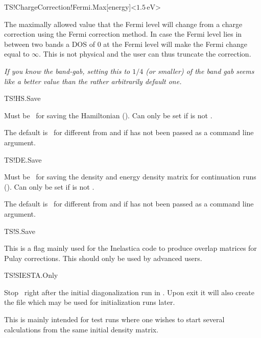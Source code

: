 \begin{fdfentry}{TS!ChargeCorrection!Fermi.Max}[energy]<$1.5\,\mathrm{eV}$>%

  The maximally allowed value that the Fermi level will change from a
  charge correction using the Fermi correction method. In case the
  Fermi level lies in between two bands a DOS of $0$ at the Fermi
  level will make the Fermi change equal to $\infty$. This is not
  physical and the user can thus truncate the correction.
  
  \emph{If you know the band-gab, setting this to $1/4$ (or smaller)
      of the band gab seems like a better value than the rather
      arbitrarily default one.}

\end{fdfentry}

\begin{fdflogicalT}{TS!HS.Save}

  Must be \fdftrue\ for saving the Hamiltonian (). Can only be set if
   is not .

  The default is \fdffalse\ for  different from
   and if  has not been passed as a
  command line argument.

\end{fdflogicalT}  

\begin{fdflogicalT}{TS!DE.Save}

  Must be \fdftrue\ for saving the density and energy density matrix
  for continuation runs (). Can only be set if
   is not .

  The default is \fdffalse\ for  different from
   and if  has not been passed as a
  command line argument.

\end{fdflogicalT}  

\begin{fdflogicalF}{TS!S.Save}

  This is a flag mainly used for the Inelastica code to produce
  overlap matrices for Pulay corrections. This should only be used by
  advanced users.

\end{fdflogicalF}


\begin{fdflogicalF}{TS!SIESTA.Only}

  Stop \tsiesta\ right after the initial diagonalization run in
  \siesta. Upon exit it will also create the  file which
  may be used for initialization runs later.

  This is mainly intended for test runs where one wishes to start
  several calculations from the same initial density matrix.

\end{fdflogicalF}


